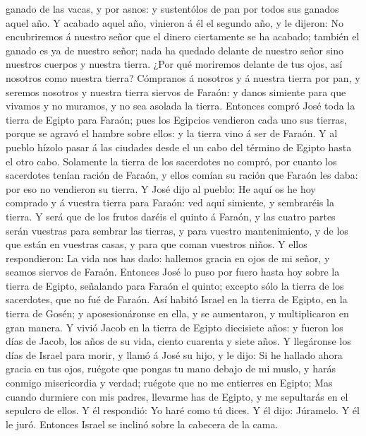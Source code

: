 ganado de las vacas, y por asnos: y sustentólos de pan por todos sus
ganados aquel año.  Y acabado aquel año, vinieron á él el
segundo año, y le dijeron: No encubriremos á nuestro señor que el dinero
ciertamente se ha acabado; también el ganado es ya de nuestro señor;
nada ha quedado delante de nuestro señor sino nuestros cuerpos y nuestra
tierra.  ¿Por qué moriremos delante de tus ojos, así
nosotros como nuestra tierra? Cómpranos á nosotros y á nuestra tierra
por pan, y seremos nosotros y nuestra tierra siervos de Faraón: y danos
simiente para que vivamos y no muramos, y no sea asolada la tierra.
 Entonces compró José toda la tierra de Egipto para Faraón;
pues los Egipcios vendieron cada uno sus tierras, porque se agravó el
hambre sobre ellos: y la tierra vino á ser de Faraón.  Y al
pueblo hízolo pasar á las ciudades desde el un cabo del término de
Egipto hasta el otro cabo.  Solamente la tierra de los
sacerdotes no compró, por cuanto los sacerdotes tenían ración de Faraón,
y ellos comían su ración que Faraón les daba: por eso no vendieron su
tierra.  Y José dijo al pueblo: He aquí os he hoy comprado
y á vuestra tierra para Faraón: ved aquí simiente, y sembraréis la
tierra.  Y será que de los frutos daréis el quinto á
Faraón, y las cuatro partes serán vuestras para sembrar las tierras, y
para vuestro mantenimiento, y de los que están en vuestras casas, y para
que coman vuestros niños.  Y ellos respondieron: La vida
nos has dado: hallemos gracia en ojos de mi señor, y seamos siervos de
Faraón.  Entonces José lo puso por fuero hasta hoy sobre la
tierra de Egipto, señalando para Faraón el quinto; excepto sólo la
tierra de los sacerdotes, que no fué de Faraón.  Así habitó
Israel en la tierra de Egipto, en la tierra de Gosén; y aposesionáronse
en ella, y se aumentaron, y multiplicaron en gran manera. 
Y vivió Jacob en la tierra de Egipto diecisiete años: y fueron los días
de Jacob, los años de su vida, ciento cuarenta y siete años.
 Y llegáronse los días de Israel para morir, y llamó á José
su hijo, y le dijo: Si he hallado ahora gracia en tus ojos, ruégote que
pongas tu mano debajo de mi muslo, y harás conmigo misericordia y
verdad; ruégote que no me entierres en Egipto;  Mas cuando
durmiere con mis padres, llevarme has de Egipto, y me sepultarás en el
sepulcro de ellos. Y él respondió: Yo haré como tú dices. 
Y él dijo: Júramelo. Y él le juró. Entonces Israel se inclinó sobre la
cabecera de la cama.

